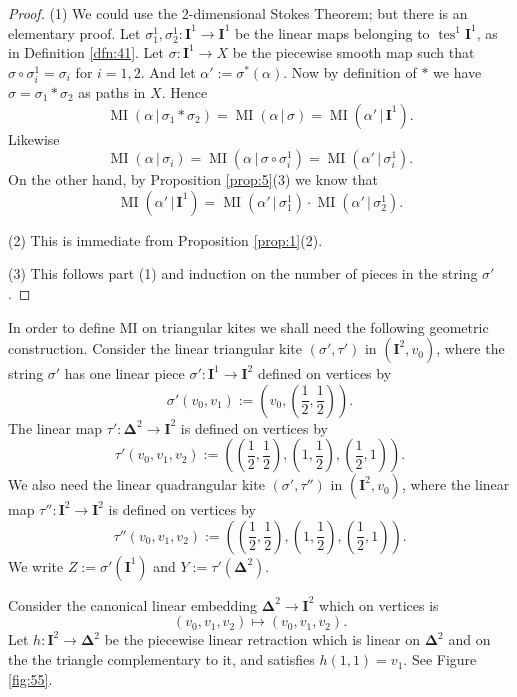 \documentclass[10pt, a4paper]{amsart}
\theoremstyle{definition}
\numberwithin{equation}{section}
\newcommand{\opn}{\operatorname}
\newcommand{\mbf}[1]{\mathbf{#1}}
\newcommand{\smfrac}[2]{{\textstyle \frac{#1}{#2}}}
\newcommand{\bsym}[1]{\boldsymbol{#1}}
\renewcommand{\vert}{\, | \,}
\begin{document}
\begin{proof}
(1) We could use the $2$-dimensional Stokes Theorem; but there is an elementary
proof. Let 
$\sigma^1_1, \sigma^1_2 : \mbf{I}^1 \to \mbf{I}^1$ be the linear maps belonging
to $\opn{tes}^1 \mbf{I}^1$, as in Definition \ref{dfn:41}. 
Let $\sigma : \mbf{I}^1 \to X$ be the piecewise smooth map such that
$\sigma \circ \sigma^1_i = \sigma_i$
for $i = 1, 2$. And let $\alpha' := \sigma^*(\alpha)$. 
Now by definition of $*$ we have
$\sigma = \sigma_1 * \sigma_2$ as paths in $X$. Hence
\[ \opn{MI}(\alpha \vert \sigma_1 * \sigma_2) = 
\opn{MI}(\alpha \vert \sigma) = \opn{MI}(\alpha' \vert \mbf{I}^1) . \]
Likewise
\[ \opn{MI}(\alpha \vert \sigma_i) = 
\opn{MI}(\alpha \vert \sigma \circ \sigma^1_i) = 
\opn{MI}(\alpha' \vert \sigma^1_i) . \]
On the other hand, by Proposition \ref{prop:5}(3) we know that
\[ \opn{MI}(\alpha' \vert \mbf{I}^1) = 
\opn{MI}(\alpha' \vert \sigma^1_1) \cdot \opn{MI}(\alpha' \vert \sigma^1_2)  .
\]

\medskip \noindent
(2) This is immediate from Proposition \ref{prop:1}(2).

\medskip \noindent
(3) This follows part (1) and induction on the number of pieces in the string
$\sigma'$.
\end{proof}

In order to define MI on triangular kites we shall need the following geometric
construction. Consider the linear triangular kite 
$(\sigma', \tau')$ in $(\mbf{I}^2, v_0)$, where the string $\sigma'$ has one
linear piece $\sigma' : \mbf{I}^1 \to \mbf{I}^2$ defined on vertices by
\[ \sigma'(v_0, v_1) := (v_0, (\smfrac{1}{2}, \smfrac{1}{2}) ) . \]
The linear map 
$\tau' : \bsym{\Delta}^2 \to \mbf{I}^2$ is defined on vertices by
\[ \tau'(v_0, v_1, v_2) := ( (\smfrac{1}{2}, \smfrac{1}{2}),
(1, \smfrac{1}{2}), (\smfrac{1}{2}, 1) ) . \]
We also need the linear quadrangular kite 
$(\sigma', \tau'')$ in $(\mbf{I}^2, v_0)$, where the linear map 
$\tau'' : \mbf{I}^2 \to \mbf{I}^2$ is defined on vertices by
\[ \tau''(v_0, v_1, v_2) := ( (\smfrac{1}{2}, \smfrac{1}{2}),
(1, \smfrac{1}{2}), (\smfrac{1}{2}, 1) ) . \]
We write
$Z := \sigma'(\mbf{I}^1)$ and $Y := \tau'(\bsym{\Delta}^2)$. 

Consider the  canonical  linear embedding 
$\bsym{\Delta}^2 \to  \mbf{I}^2$ 
which on vertices is
\[ (v_0, v_1, v_2) \mapsto (v_0, v_1, v_2) . \]
Let $h : \mbf{I}^2 \to \bsym{\Delta}^2$ be the piecewise linear retraction
which is linear on $\bsym{\Delta}^2$ and on the the triangle complementary to
it, and satisfies $h(1, 1) = v_1$. See Figure \ref{fig:55}.
\end{document}
